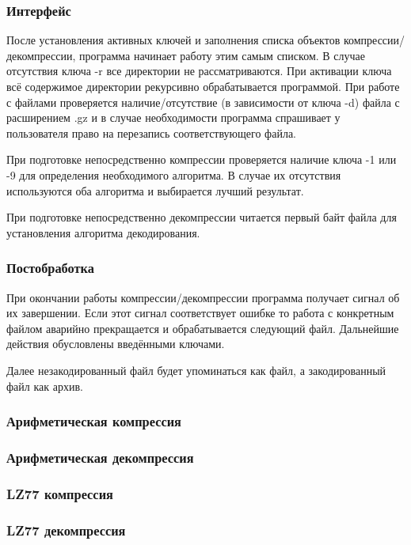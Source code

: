 \documentclass[12pt]{article}
\begin{document}
\subsubsection*{Интерфейс}

После установления активных ключей и заполнения списка объектов компрессии/декомпрессии, программа начинает работу  этим самым списком. В случае отсутствия ключа -r все директории не рассматриваются. При активации ключа всё содержимое директории рекурсивно обрабатывается программой. При работе с файлами проверяется наличие/отсутствие (в зависимости от ключа -d) файла с расширением .gz и в случае необходимости программа спрашивает у пользователя право на перезапись соответствующего файла.

При подготовке непосредственно компрессии проверяется наличие ключа -1 или -9 для определения необходимого алгоритма. В случае их отсутствия используются оба алгоритма и выбирается лучший результат.

При подготовке непосредственно декомпрессии читается первый байт файла для установления алгоритма декодирования.

\subsubsection*{Постобработка}

При окончании работы компрессии/декомпрессии программа получает сигнал об их завершении. Если этот сигнал соответствует ошибке то работа с конкретным файлом аварийно прекращается и обрабатывается следующий файл. Дальнейшие действия обусловлены введёнными ключами.

Далее незакодированный файл будет упоминаться как файл, а закодированный файл как архив.%

\subsubsection*{Арифметическая компрессия}%

\subsubsection*{Арифметическая декомпрессия}%

\subsubsection*{LZ77 компрессия}%

\subsubsection*{LZ77 декомпрессия}%
\end{document}
